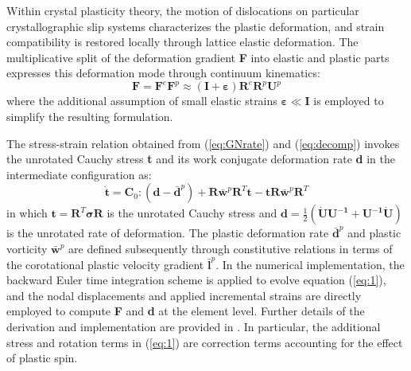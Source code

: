 \documentclass[review]{elsarticle}
\begin{document}
	Within crystal plasticity theory, the motion of dislocations on particular crystallographic slip systems characterizes the plastic deformation, and strain compatibility is restored locally through lattice elastic deformation.
	The multiplicative split of the deformation gradient \textbf{F} into elastic and plastic parts expresses this deformation mode through continuum kinematics:
	\begin{equation}
	\label{eq:decomp}
	\mathbf{F} = \mathbf{F}^e \mathbf{F}^p \approx \left( \mathbf{I}+\bm{\varepsilon} \right) \mathbf{R}^e \mathbf{R}^p \mathbf{U}^p
	\end{equation}
	where the additional assumption of small elastic strains $\bm{\varepsilon} \ll \mathbf{I}$ is employed to simplify the resulting formulation.
	
	The stress-strain relation obtained from (\ref{eq:GNrate}) and (\ref{eq:decomp}) invokes the unrotated Cauchy stress \textbf{t} and its work conjugate deformation rate \textbf{d} in the intermediate configuration as:
	\begin{equation}
	\dot{\mathbf{t}}=\mathbf{C}_0:\left(\mathbf{d}-\bar{\mathbf{d}}^p\right) + \mathbf{R\bar{w}}^p\mathbf{R}^T\mathbf{t} - \mathbf{tR\bar{w}}^p\mathbf{R}^T 
	\label{eq:1}
	\end{equation}
	in which $\mathbf{t = R}^T \bm{\sigma}\mathbf{R}$ is the unrotated Cauchy stress and $\mathbf{d} = \frac{1}{2} \mathbf{\left( \dot{U}U^{-1} + U^{-1}\dot{U} \right)}$ is the unrotated rate of deformation.
	The plastic deformation rate $\bar{\mathbf{d}}^p$ and plastic vorticity $\bar{\mathbf{w}}^p$ are defined subsequently through constitutive relations in terms of the corotational plastic velocity gradient $\bar{\mathbf{l}}^p$.
	In the numerical implementation, the backward Euler time integration scheme is applied to evolve equation (\ref{eq:1}), and the nodal displacements and applied incremental strains are directly employed to compute \textbf{F} and \textbf{d} at the element level.
	Further details of the derivation and implementation are provided in \cite{r22}.
	In particular, the additional stress and rotation terms in (\ref{eq:1}) are correction terms accounting for the effect of plastic spin.
	
\end{document}
